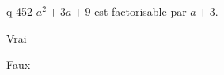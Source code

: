 \begin{truefalse}{q-452}
$a^2+3a+9$ est factorisable par $a+3$.
\item Vrai
\item* Faux
\end{truefalse}

